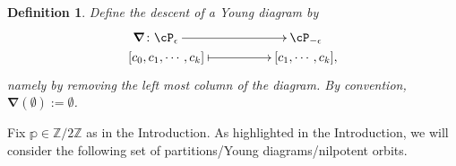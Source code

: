 \documentclass[12pt,a4paper]{amsart}
\makeatletter
\newcommand{\depth}{\mathrm{depth}}
\def\inn#1#2{\left\langle
      \def\ta{#1}\def\tb{#2}
      \ifx\ta\@empty{\;} \else {\ta}\fi ,
      \ifx\tb\@empty{\;} \else {\tb}\fi
      \right\rangle}
\newcommand{\Z}{\mathbb{Z}}
\def\DD{\nabla}
\def\DDc{\boldsymbol{\nabla}}
\numberwithin{equation}{section}
\def\flushmr#1{\makebox[0pt][r]{${#1}$}}
\newtheorem{defn}[thm]{Definition}
\theoremstyle{remark}
\makeatother
\begin{document}

\begin{defn}\label{defdo}
Define the descent of a Young diagram by
\[
\xymatrix@R=0em@C=5em{
  \flushmr{\DDc\colon} \cP_{\epsilon} \ar[r] & \cP_{-\epsilon}\\
[c_0,c_1,\cdots ,c_k] \ar@{|->}[r]&  [c_1,\cdots, c_k],
}
\]
namely by removing the left most column of the diagram.
By convention,  $\DDc(\emptyset) := \emptyset$.
\end{defn}




Fix $\mathbb p\in \Z/2\Z$ as in the Introduction. As highlighted in the Introduction, we will  consider the following set of partitions/Young diagrams/nilpotent orbits.
\end{document}
